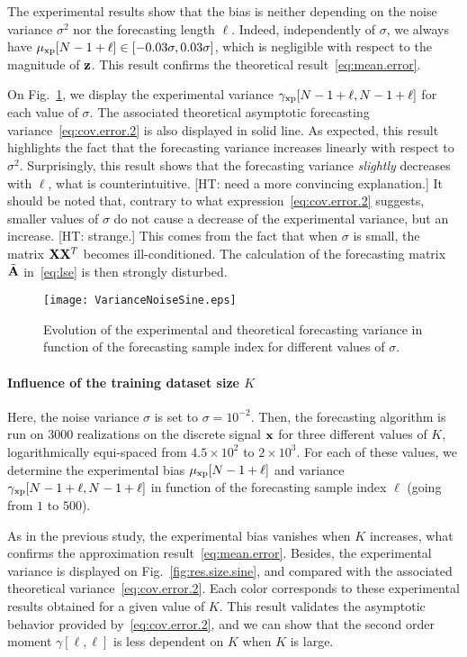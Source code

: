 The experimental results show that the bias is neither depending on the noise variance $\sigma^2$ nor the forecasting length $\ell$. Indeed, independently of $\sigma$, we always have $\mu_{{\mathrm{xp}}}[N-1+\ell]\in\left[-0.03\sigma,0.03\sigma\right]$, which is negligible with respect to the magnitude of ${\mathbf z}$. This result confirms the theoretical result~\eqref{eq:mean.error}. 

On Fig.~\ref{fig:res.noise.sine}, we display the experimental variance $\gamma_{{\mathrm{xp}}}[N-1+\ell,N-1+\ell]$ for each value of $\sigma$. The associated theoretical asymptotic forecasting variance~\eqref{eq:cov.error.2} is also displayed in solid line. As expected, this result highlights the fact that the forecasting variance increases linearly with respect to $\sigma^2$. Surprisingly, this result shows that the forecasting variance {\em slightly} decreases with $\ell$, what is counterintuitive. 
%
{\color{red} [HT: need a more convincing explanation.] It should be noted that, contrary to what expression~\eqref{eq:cov.error.2} suggests, smaller values of $\sigma$ do not cause a decrease of the experimental variance, but an increase. [HT: strange.]} This comes from the fact that when $\sigma$ is small, the matrix ${\mathbf X}{\mathbf X}^T$ becomes ill-conditioned. The calculation of the forecasting matrix $\tilde{{\mathbf A}}$ in~\eqref{eq:lse} is then strongly disturbed.
\begin{figure}
\texttt{[image: VarianceNoiseSine.eps]}
\caption{Evolution of the experimental and theoretical forecasting variance in function of the forecasting sample index for different values of $\sigma$.}
\label{fig:res.noise.sine}
\end{figure}

\paragraph{Influence of the training dataset size $K$} Here, the noise variance $\sigma$ is set to $\sigma=10^{-2}$. Then, the forecasting algorithm is run on 3000 realizations on the discrete signal ${\mathbf x}$ for three different values of $K$, logarithmically equi-spaced from $4.5\times 10^{2}$ to $2\times 10^{3}$. For each of these values, we determine the experimental bias $\mu_{{\mathrm{xp}}}[N-1+\ell]$ and variance $\gamma_{{\mathrm{xp}}}[N-1+\ell,N-1+\ell]$ in function of the forecasting sample index $\ell$ (going from $1$ to $500$). 

As in the previous study, the experimental bias vanishes when $K$ increases, what confirms the approximation result~\eqref{eq:mean.error}. Besides, the experimental variance  is displayed on Fig.~\ref{fig:res.size.sine}, and compared with the associated theoretical variance~\eqref{eq:cov.error.2}. Each color corresponds to these experimental results obtained for a given value of $K$. This result validates the asymptotic behavior provided by~\eqref{eq:cov.error.2}, and we can show that the second order moment $\gamma[\ell,\ell]$ is less dependent on $K$ when $K$ is large.


